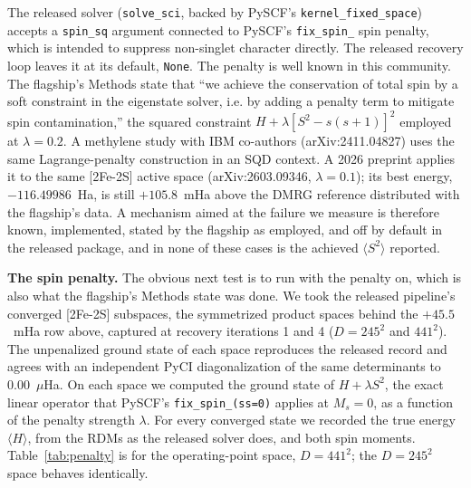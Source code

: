\documentclass[11pt]{article}
\newcommand{\ssq}{\ensuremath{\langle S^2\rangle}}
\begin{document}
The released solver (\texttt{solve\_sci}, backed by PySCF's \texttt{kernel\_fixed\_space}) accepts a \texttt{spin\_sq} argument connected to PySCF's \texttt{fix\_spin\_} spin penalty, which is intended to suppress non-singlet character directly. The released recovery loop leaves it at its default, \texttt{None}. The penalty is well known in this community. The flagship's Methods state that ``we achieve the conservation of total spin by a soft constraint in the eigenstate solver, i.e. by adding a penalty term to mitigate spin contamination,'' the squared constraint $H+\lambda[S^2-s(s+1)]^2$ employed at $\lambda=0.2$. A methylene study with IBM co-authors (arXiv:2411.04827) uses the same Lagrange-penalty construction in an SQD context. A 2026 preprint applies it to the same [2Fe-2S] active space (arXiv:2603.09346, $\lambda=0.1$); its best energy, $-116.49986$~Ha, is still $+105.8$~mHa above the DMRG reference distributed with the flagship's data. A mechanism aimed at the failure we measure is therefore known, implemented, stated by the flagship as employed, and off by default in the released package, and in none of these cases is the achieved \ssq{} reported.

\textbf{The spin penalty.} The obvious next test is to run with the penalty on, which is also what the flagship's Methods state was done. We took the released pipeline's converged [2Fe-2S] subspaces, the symmetrized product spaces behind the $+45.5$~mHa row above, captured at recovery iterations 1 and 4 ($D = 245^2$ and $441^2$). The unpenalized ground state of each space reproduces the released record and agrees with an independent PyCI diagonalization of the same determinants to 0.00~$\mu$Ha. On each space we computed the ground state of $H + \lambda S^2$, the exact linear operator that PySCF's \texttt{fix\_spin\_(ss=0)} applies at $M_s = 0$, as a function of the penalty strength $\lambda$. For every converged state we recorded the true energy $\langle H\rangle$, from the RDMs as the released solver does, and both spin moments. Table~\ref{tab:penalty} is for the operating-point space, $D = 441^2$; the $D = 245^2$ space behaves identically.
\end{document}
